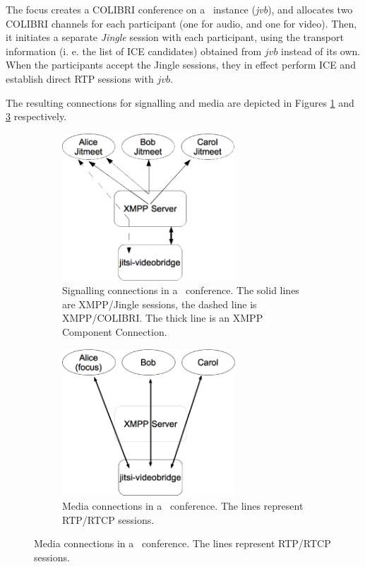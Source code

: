\documentclass[twoside,openright,a4paper,12pt,english]{article}
\begin{document}
The focus creates a COLIBRI conference on a \jvb\ instance (\emph{jvb}), and allocates
two COLIBRI channels for each participant (one for audio, and one for video).
Then, it initiates a separate \emph{Jingle} session with
each participant, using the
transport information (i. e. the list of ICE candidates) obtained from $jvb$
instead of its own. When the participants accept the Jingle sessions, they in
effect perform ICE and establish direct RTP sessions with $jvb$.

The resulting connections for signalling and media are depicted in Figures
\ref{jitmeet-sig} and \ref{jitmeet-med} respectively.


\begin{figure}[h]
   \centering
        \begin{subfigure}[t]{0.4\textwidth}
            \includegraphics[height=5.5cm]{./pics/jm-sig.eps}
            \caption{Signalling connections in a \jm\ conference.
                The solid lines are XMPP/Jingle sessions, the dashed line
                is XMPP/COLIBRI. The thick line is an XMPP Component Connection.}
            \label{jitmeet-sig}
        \end{subfigure}
        \quad
        \quad
        \quad
        \begin{subfigure}[t]{0.4\textwidth}
            \includegraphics[height=5.5cm]{./pics/jm-med.eps}
            \caption{Media connections in a \jm\ conference. The
                lines represent RTP/RTCP sessions.}
            \label{jitmeet-med}
        \end{subfigure}
\end{figure}
\end{document}
